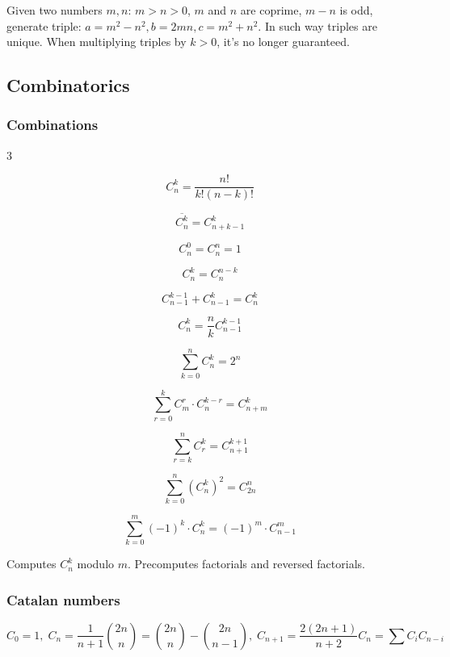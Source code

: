 Given two numbers $m,n$: $m > n > 0$, $m$ and $n$ are coprime, $m - n$ is odd, generate triple: $a = m^2 - n^2, b = 2mn, c = m^2 + n^2$.
In such way triples are unique.
When multiplying triples by $k > 0$, it's no longer guaranteed.

\subsection{Combinatorics}

\subsubsection{Combinations}

\vspace{-1.5em}
\begin{multicols}{3}

  $$C_n^k = \frac{n!}{k!(n-k)!}$$

  $$\overline{C_n^k} = C_{n+k-1}^k$$

  $$C_n^0 = C_n^n = 1$$

  $$C_n^k = C_n^{n - k}$$

  $$C_{n - 1}^{k - 1} + C_{n - 1}^k = C_n^k$$

  $$C_n^k = \frac{n}{k} C_{n - 1}^{k - 1}$$

  $$\sum\limits_{k=0}^n C_n^k = 2^n$$

  $$\sum\limits_{r=0}^k C_m^r \cdot C_n^{k - r} = C_{n + m}^k$$

  $$\sum\limits_{r=k}^n C_r^k = C_{n+1}^{k+1}$$

  $$\sum\limits_{k=0}^n \left(C_n^k\right)^2 = C_{2n}^n$$

  $$\sum\limits_{k=0}^m (-1)^k \cdot C_n^k = (-1)^m \cdot C_{n - 1}^m$$

\end{multicols}

Computes $C_n^k$ modulo $m$.
Precomputes factorials and reversed factorials. 

\subsubsection{Catalan numbers}

$$C_0 = 1,\; C_n = \frac1{n+1} \binom{2n}{n} = \binom{2n}{n} - \binom{2n}{n-1},\; C_{n+1}=\frac{2(2n+1)}{n+2}C_n = \sum C_i C_{n-i}$$

